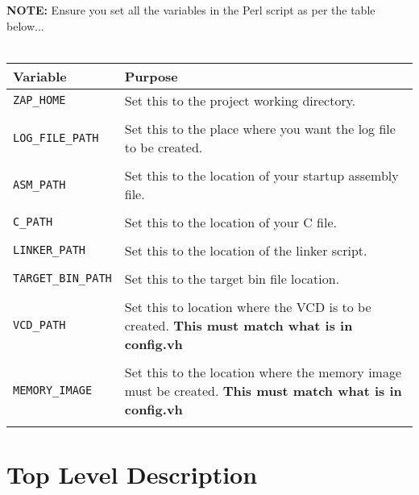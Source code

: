 \documentclass[11pt]{article}
\begin{document}
\textbf{NOTE:} Ensure you set all the variables in the Perl script as per the 
table below...\\\\

\begin{tabularx}{\textwidth}{| X | X |}
 \hline
        \textbf{Variable} & \textbf{Purpose} \\
 \hline

 \texttt{ZAP\_HOME} & Set this to the project working directory.\\\\

 \texttt{LOG\_FILE\_PATH} & Set this to the place where you want the log file to 
 be created.\\\\

 \texttt{ASM\_PATH} & Set this to the location of your startup assembly file.
 \\\\

 \texttt{C\_PATH} & Set this to the location of your C file. \\\\

 \texttt{LINKER\_PATH} & Set this to the location of the linker script. \\\\

 \texttt{TARGET\_BIN\_PATH} & Set this to the target bin file location. \\\\

 \texttt{VCD\_PATH} & Set this to location where the VCD is to be created.
 \textbf{This must match what is in config.vh} \\\\

 \texttt{MEMORY\_IMAGE} & Set this to the location where the memory image must be
 created. 
 \textbf{This must match what is in config.vh} \\\\

 \hline
\end{tabularx}


\pagebreak
\section{Top Level Description}
\end{document}

